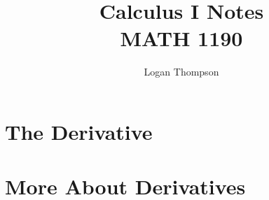 

\title{
    Calculus I Notes\\
    \large MATH 1190}
\author{Logan Thompson}
\date{}


\hypersetup{pageanchor=false}
\maketitle
\hypersetup{pageanchor=true}
\tableofcontents
\newpage
{}
\chapter{The Derivative}





\chapter{More About Derivatives}



\appendix


